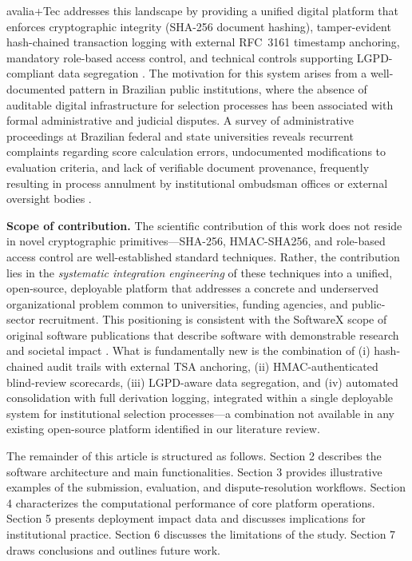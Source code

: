 \documentclass[preprint,12pt,a4paper]{elsarticle}
\begin{document}
avalia+Tec addresses this landscape by providing a unified digital platform that enforces cryptographic integrity (SHA-256 document hashing), tamper-evident hash-chained transaction logging with external RFC~3161 timestamp anchoring, mandatory role-based access control, and technical controls supporting LGPD-compliant data segregation \citep{Piotrowski2007,Marques2022}. The motivation for this system arises from a well-documented pattern in Brazilian public institutions, where the absence of auditable digital infrastructure for selection processes has been associated with formal administrative and judicial disputes. A survey of administrative proceedings at Brazilian federal and state universities reveals recurrent complaints regarding score calculation errors, undocumented modifications to evaluation criteria, and lack of verifiable document provenance, frequently resulting in process annulment by institutional ombudsman offices or external oversight bodies \citep{Machado2018,Hood2007}.

\textbf{Scope of contribution.} The scientific contribution of this work does not reside in novel cryptographic primitives---SHA-256, HMAC-SHA256, and role-based access control are well-established standard techniques. Rather, the contribution lies in the \emph{systematic integration engineering} of these techniques into a unified, open-source, deployable platform that addresses a concrete and underserved organizational problem common to universities, funding agencies, and public-sector recruitment. This positioning is consistent with the SoftwareX scope of original software publications that describe software with demonstrable research and societal impact \citep{Sommerville2016}. What is fundamentally new is the combination of (i) hash-chained audit trails with external TSA anchoring, (ii) HMAC-authenticated blind-review scorecards, (iii) LGPD-aware data segregation, and (iv) automated consolidation with full derivation logging, integrated within a single deployable system for institutional selection processes---a combination not available in any existing open-source platform identified in our literature review.

The remainder of this article is structured as follows. Section 2 describes the software architecture and main functionalities. Section 3 provides illustrative examples of the submission, evaluation, and dispute-resolution workflows. Section 4 characterizes the computational performance of core platform operations. Section 5 presents deployment impact data and discusses implications for institutional practice. Section 6 discusses the limitations of the study. Section 7 draws conclusions and outlines future work.
\end{document}
